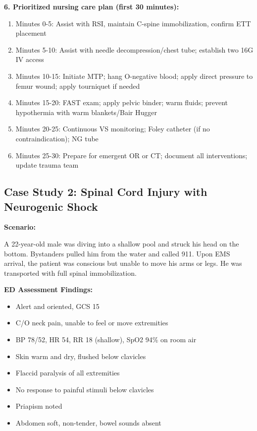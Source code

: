 \documentclass[11pt]{article}
\begin{document}
\begin{tcolorbox}[colback=green!5!white,colframe=green!75!black,title=Case Study 1 - Answers]
\textbf{6. Prioritized nursing care plan (first 30 minutes):}
\begin{enumerate}
    \item Minutes 0-5: Assist with RSI, maintain C-spine immobilization, confirm ETT placement
    \item Minutes 5-10: Assist with needle decompression/chest tube; establish two 16G IV access
    \item Minutes 10-15: Initiate MTP; hang O-negative blood; apply direct pressure to femur wound; apply tourniquet if needed
    \item Minutes 15-20: FAST exam; apply pelvic binder; warm
fluids; prevent hypothermia with warm blankets/Bair Hugger
    \item Minutes 20-25: Continuous VS monitoring; Foley catheter (if no contraindication); NG tube
    \item Minutes 25-30: Prepare for emergent OR or CT; document all interventions; update trauma team
\end{enumerate}
\end{tcolorbox}

\newpage
\subsection*{Case Study 2: Spinal Cord Injury with Neurogenic Shock}

\textbf{Scenario:}

A 22-year-old male was diving into a shallow pool and struck his head on the bottom. Bystanders pulled him from the water and called 911. Upon EMS arrival, the patient was conscious but unable to move his arms or legs. He was transported with full spinal immobilization.

\textbf{ED Assessment Findings:}
\begin{itemize}
    \item Alert and oriented, GCS 15
    \item C/O neck pain, unable to feel or move extremities
    \item BP 78/52, HR 54, RR 18 (shallow), SpO2 94\% on room air
    \item Skin warm and dry, flushed below clavicles
    \item Flaccid paralysis of all extremities
    \item No response to painful stimuli below clavicles
    \item Priapism noted
    \item Abdomen soft, non-tender, bowel sounds absent
\end{itemize}
\end{document}

